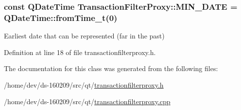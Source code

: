 \subsubsection[{M\+I\+N\+\_\+\+D\+A\+T\+E}]{\setlength{\rightskip}{0pt plus 5cm}const Q\+Date\+Time Transaction\+Filter\+Proxy\+::\+M\+I\+N\+\_\+\+D\+A\+T\+E = Q\+Date\+Time\+::from\+Time\+\_\+t(0)\hspace{0.3cm}{\ttfamily [static]}}\label{class_transaction_filter_proxy_aac7bf4c1105641b19eb6f7c8741b502e}
Earliest date that can be represented (far in the past) 

Definition at line 18 of file transactionfilterproxy.\+h.



The documentation for this class was generated from the following files\+:\begin{DoxyCompactItemize}
\item 
/home/dev/ds-\/160209/src/qt/\hyperlink{transactionfilterproxy_8h}{transactionfilterproxy.\+h}\item 
/home/dev/ds-\/160209/src/qt/\hyperlink{transactionfilterproxy_8cpp}{transactionfilterproxy.\+cpp}\end{DoxyCompactItemize}
